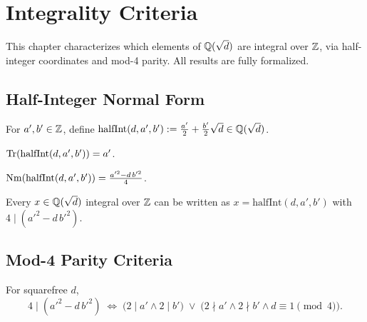 \chapter{Integrality Criteria}\label{ch:integrality}

This chapter characterizes which elements of $\mathbb{Q}(\sqrt{d})$ are integral
over $\mathbb{Z}$, via half-integer coordinates and mod-4 parity.
All results are fully formalized.

\section{Half-Integer Normal Form}

\begin{definition}\label{def:half_int}
  \leanok
  For $a',b'\in\mathbb{Z}$, define
  $\mathrm{halfInt}(d,a',b') := \frac{a'}{2} + \frac{b'}{2}\sqrt{d}
  \in\mathbb{Q}(\sqrt{d})$.
\end{definition}

\begin{lemma}\label{lem:trace_half_int}
  \leanok
  $\operatorname{Tr}(\mathrm{halfInt}(d,a',b')) = a'$.
\end{lemma}

\begin{lemma}\label{lem:norm_half_int}
  \leanok
  $\operatorname{Nm}(\mathrm{halfInt}(d,a',b')) = \frac{a'^2 - d\,b'^2}{4}$.
\end{lemma}

\begin{theorem}\label{thm:integral_half_int}
  \leanok
  Every $x\in\mathbb{Q}(\sqrt{d})$ integral over $\mathbb{Z}$ can be written as
  $x = \mathrm{halfInt}(d,a',b')$ with $4\mid(a'^2 - d\,b'^2)$.
\end{theorem}

\section{Mod-4 Parity Criteria}

\begin{theorem}\label{thm:mod_four_dichotomy}
  \leanok
  For squarefree $d$,
  \[
    4\mid(a'^2 - d\,b'^2) \;\Longleftrightarrow\;
    \bigl(2\mid a' \wedge 2\mid b'\bigr)
    \;\lor\;
    \bigl(2\nmid a' \wedge 2\nmid b' \wedge d\equiv 1\pmod{4}\bigr).
  \]
\end{theorem}

